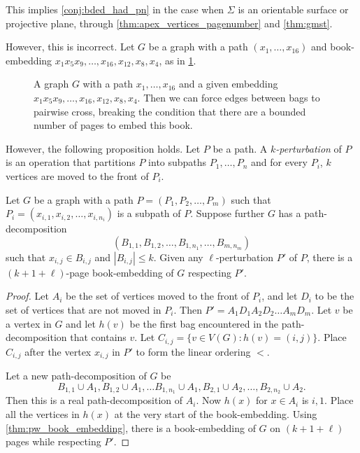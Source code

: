 This implies \cref{conj:bded_had_pn} in the case when $\Sigma$ is an orientable surface or projective plane, through \cref{thm:apex_vertices_pagenumber} and \cref{thm:gmst}. 

However, this is incorrect. Let $G$ be a graph with a path $(x_1, \ldots, x_{16})$ and book-embedding $x_1 x_5 x_9, \ldots, x_{16}, x_{12}, x_{8}, x_{4}$, as in \cref{fig:counterexample_2}.

\begin{figure}[h!]
	\centering
	
	\caption[Counterexample to bounded number of colours]{A graph $G$ with a path $x_1, \ldots, x_{16}$ and a given embedding $x_1 x_5 x_9, \ldots, x_{16}, x_{12}, x_{8}, x_{4}$. Then we can force edges between bags to pairwise cross, breaking the condition that there are a bounded number of pages to embed this book.}\label{fig:counterexample_2}
\end{figure}


However, the following proposition holds. Let $P$ be a path. A \textit{$k$-perturbation} of $P$ is an operation that partitions $P$ into subpaths $P_1, \ldots, P_n$ and for every $P_i$, $k$ vertices are moved to the front of $P_i$. 

\begin{proposition}\label{prop:k-perturbation}
	Let $G$ be a graph with a path $P = (P_1, P_2, \ldots, P_m)$ such that $P_i = (x_{i,1}, x_{i,2}, \ldots, x_{i, n_{i}})$ is a subpath of $P$. Suppose further $G$ has a path-decomposition \[(B_{1,1}, B_{1,2}, \ldots, B_{1,n_{1}}, \ldots, B_{m, n_{m}})\] such that $x_{i,j} \in B_{i,j}$ and $|B_{i,j}| \leq k$. Given any $\ell$-perturbation $P'$ of $P$, there is a $(k + 1 + \ell)$-page book-embedding of $G$ respecting $P'$.
\end{proposition}

\begin{proof}
	Let $A_i$ be the set of vertices moved to the front of $P_i$, and let $D_i$ to be the set of vertices that are not moved in $P_i$. Then $P' = A_1 D_1 A_2 D_2 \ldots A_m D_m$. 
	Let $v$ be a vertex in $G$ and let $h(v)$ be the first bag encountered in the path-decomposition that contains $v$.
	Let $C_{i,j} = \{v \in V(G): h(v) = (i,j)\}$. Place $C_{i,j}$ after the vertex $x_{i,j}$ in $P'$ to form the linear ordering $<$.

	Let a new path-decomposition of $G$ be \[B_{1,1} \cup A_1, B_{1,2} \cup A_1, \ldots B_{1, n_1} \cup A_1, B_{2,1} \cup A_2, \ldots, B_{2,n_2} \cup A_2.\] Then this is a real path-decomposition of $A_i$. Now $h(x)$ for $x \in A_i$ is ${i, 1}$. Place all the vertices in $h(x)$ at the very start of the book-embedding. Using \cref{thm:pw_book_embedding}, there is a book-embedding of $G$ on $(k + 1 + \ell)$ pages while respecting $P'$. 

\end{proof}

